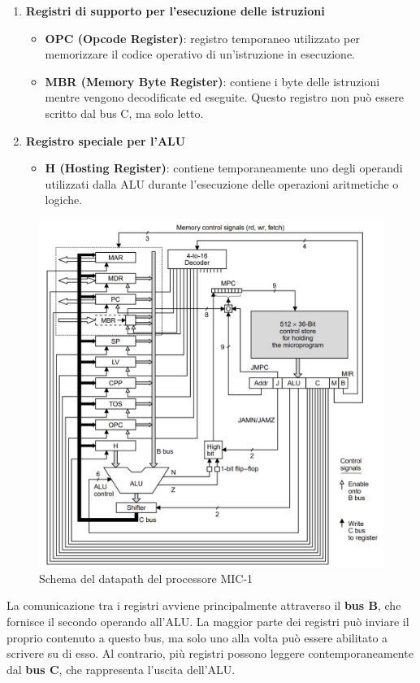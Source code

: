 \begin{enumerate}
    \item \textbf{Registri di supporto per l'esecuzione delle istruzioni}
    \begin{itemize}
        \item \textbf{OPC (Opcode Register)}: registro temporaneo utilizzato per memorizzare il codice operativo di un'istruzione in esecuzione.
        \item \textbf{MBR (Memory Byte Register)}: contiene i byte delle istruzioni mentre vengono decodificate ed eseguite. Questo registro non può essere scritto dal bus C, ma solo letto.
    \end{itemize}

    \item \textbf{Registro speciale per l'ALU}
    \begin{itemize}
        \item \textbf{H (Hosting Register)}: contiene temporaneamente uno degli operandi utilizzati dalla ALU durante l'esecuzione delle operazioni aritmetiche o logiche.
    \end{itemize}
\end{enumerate}

\begin{figure}[h]
    \centering
    \includegraphics[width=0.8\linewidth]{img/mic1_datapath.jpg}
    \caption{Schema del datapath del processore MIC-1}
    \label{fig:mic1_datapath}
\end{figure}

La comunicazione tra i registri avviene principalmente attraverso il \textbf{bus B}, che fornisce il secondo operando all'ALU. La maggior parte dei registri può inviare il proprio contenuto a questo bus, ma solo uno alla volta può essere abilitato a scrivere su di esso. Al contrario, più registri possono leggere contemporaneamente dal \textbf{bus C}, che rappresenta l'uscita dell'ALU.


